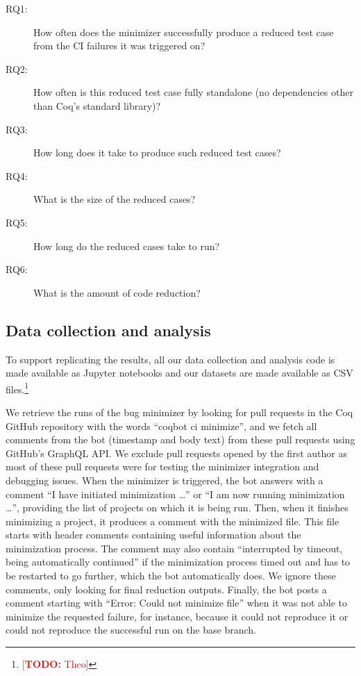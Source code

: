 \documentclass[a4paper,USenglish,cleveref,autoref,thm-restate]{lipics-v2021}
\makeatletter
\newcommand{\todo}[1]{%
\@latex@warning{TODO: \detokenize{#1} on page \thepage}%
\textcolor{red}{[\textbf{TODO:} #1]}}%
\makeatother
\begin{document}
\begin{description}
\item[RQ1:] How often does the minimizer successfully produce a reduced test case from the CI failures it was triggered on?
\item[RQ2:] How often is this reduced test case fully standalone (no dependencies other than Coq's standard library)?
\item[RQ3:] How long does it take to produce such reduced test cases?
\item[RQ4:] What is the size of the reduced cases?
\item[RQ5:] How long do the reduced cases take to run?
\item[RQ6:] What is the amount of code reduction?
\end{description}

\subsection{Data collection and analysis}

To support replicating the results, all our data collection and analysis code is made available as Jupyter notebooks and our datasets are made available as CSV files.\footnote{\todo{Theo}}

We retrieve the runs of the bug minimizer by looking for pull requests in the Coq GitHub repository with the words ``coqbot ci minimize'', and we fetch all comments from the bot (timestamp and body text) from these pull requests using GitHub's GraphQL API.
We exclude pull requests opened by the first author as most of these pull requests were for testing the minimizer integration and debugging issues.
When the minimizer is triggered, the bot answers with a comment ``I have initiated minimization \ldots'' or ``I am now running minimization \ldots'', providing the list of projects on which it is being run.
%
Then, when it finishes minimizing a project, it produces a comment with the minimized file.
%
This file starts with header comments containing useful information about the minimization process. %
%
The comment may also contain ``interrupted by timeout, being automatically continued'' if the minimization process timed out and has to be restarted to go further, which the bot automatically does.
%
We ignore these comments, only looking for final reduction outputs.
%
Finally, the bot posts a comment starting with ``Error: Could not minimize file'' when it was not able to minimize the requested failure, for instance, because it could not reproduce it or could not reproduce the successful run on the base branch.
\end{document}
